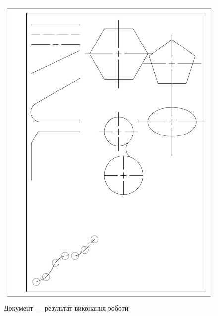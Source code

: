 \documentclass[
	a4paper,
	oneside,
	BCOR = 10mm,
	DIV = 12,
	12pt,
	headings = normal,
]{scrartcl}
\begin{document}
		\begin{figure}[!htbp]
			\centering
			\includegraphics[width=\columnwidth]{./assets/klokun-v02.pdf}
			\caption{Документ — результат виконання роботи}
			\label{fig:doc-result}
		\end{figure}
\end{document}
